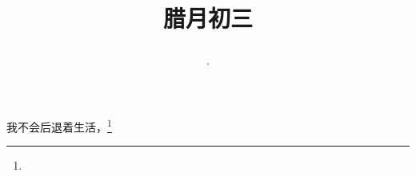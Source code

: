 \title{\date[d=13,m=1,y=2024][year:cn-y,年,month:cn,day:cn,日,·,weekday]·腊月初三 }
我不会后退着生活，\footnote{ }

